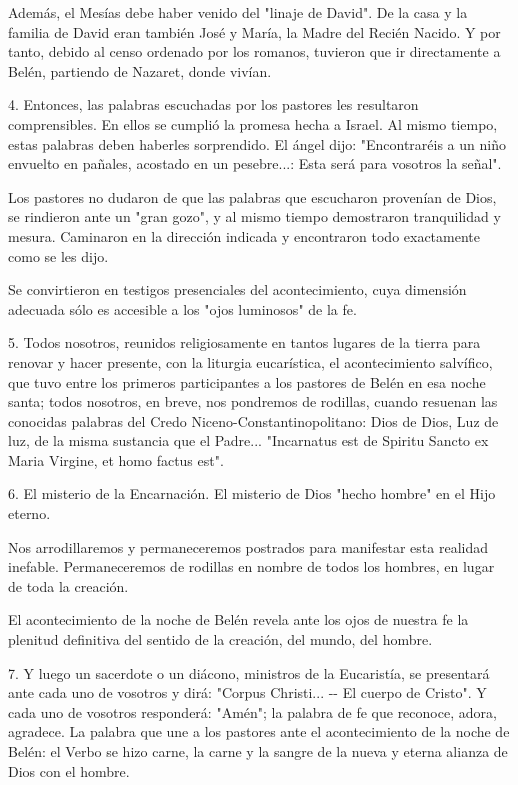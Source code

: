 \begin{body}
\begin{body}
Además, el Mesías debe haber venido del "linaje de David". De la casa y la familia de David eran también José y María, la Madre del Recién Nacido. Y por tanto, debido al censo ordenado por los romanos, tuvieron que ir directamente a Belén, partiendo de Nazaret, donde vivían.

4. Entonces, las palabras escuchadas por los pastores les resultaron comprensibles. En ellos se cumplió la promesa hecha a Israel. Al mismo tiempo, estas palabras deben haberles sorprendido. El ángel dijo: "Encontraréis a un niño envuelto en pañales, acostado en un pesebre...: Esta será para vosotros la señal".

Los pastores no dudaron de que las palabras que escucharon provenían de Dios, se rindieron ante un "gran gozo", y al mismo tiempo demostraron tranquilidad y mesura. Caminaron en la dirección indicada y encontraron todo exactamente como se les dijo.

Se convirtieron en testigos presenciales del acontecimiento, cuya dimensión adecuada sólo es accesible a los "ojos luminosos" de la fe.

5. Todos nosotros, reunidos religiosamente en tantos lugares de la tierra para renovar y hacer presente, con la liturgia eucarística, el acontecimiento salvífico, que tuvo entre los primeros participantes a los pastores de Belén en esa noche santa; todos nosotros, en breve, nos pondremos de rodillas, cuando resuenan las conocidas palabras del Credo Niceno-Constantinopolitano: Dios de Dios, Luz de luz, de la misma sustancia que el Padre... "Incarnatus est de Spiritu Sancto ex Maria Virgine, et homo factus est".

6. El misterio de la Encarnación. El misterio de Dios "hecho hombre" en el Hijo eterno.

Nos arrodillaremos y permaneceremos postrados para manifestar esta realidad inefable. Permaneceremos de rodillas en nombre de todos los hombres, en lugar de toda la creación.

El acontecimiento de la noche de Belén revela ante los ojos de nuestra fe la plenitud definitiva del sentido de la creación, del mundo, del hombre.

7. Y luego un sacerdote o un diácono, ministros de la Eucaristía, se presentará ante cada uno de vosotros y dirá: "Corpus Christi... -\/- El cuerpo de Cristo". Y cada uno de vosotros responderá: "Amén"; la palabra de fe que reconoce, adora, agradece. La palabra que une a los pastores ante el acontecimiento de la noche de Belén: el Verbo se hizo carne, la carne y la sangre de la nueva y eterna alianza de Dios con el hombre.


\end{body}
\end{body}
